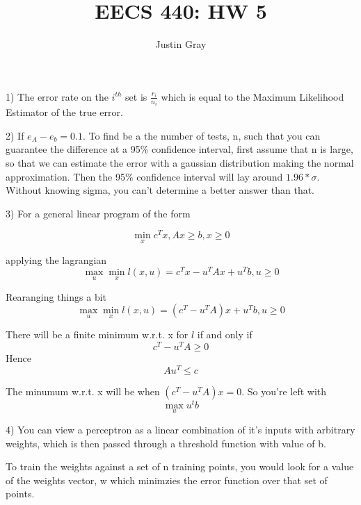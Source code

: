 \documentclass[12pt]{article}
\title{EECS 440: HW 5}
\author{Justin Gray}
\begin{document}
\maketitle
\setcounter{equation}{0}

1) The error rate on the $i^{th}$ set is $\frac{r_i}{n_i}$ which is equal to the 
Maximum Likelihood Estimator of the true error. 

2) If $e_A - e_b = 0.1$. To find be a the 
number of tests, n, such that you can guarantee the difference at a 95\% 
confidence interval, first assume that n is large, so that we can estimate the 
error with a gaussian distribution making the normal approximation. Then 
the 95\% confidence interval will lay around $1.96*\sigma$. Without knowing 
sigma, you can't determine a better answer than that. 

\setcounter{equation}{0}

3) 
For a general linear program of the form

\begin{equation}
    \min_x c^T x, Ax \geq b, x \geq 0
\end{equation}

applying the lagrangian
\begin{equation}
   \max_u \min_x l(x,u) = c^T x - u^T A x + u^T b, u \geq 0
\end{equation} 

Rearanging things a bit
\begin{equation}
     \max_u \min_x l(x,u) = \left(c^T - u^T A \right) x + u^T b, u \geq 0
\end{equation}

There will be a finite minimum w.r.t. x for $l$ if and only if 
\begin{equation}
    c^T - u^T A  \geq 0 
\end{equation}
Hence
\begin{equation}
    A u^T \leq c 
\end{equation}

The minumum w.r.t. x will be when $\left(c^T - u^T A \right) x = 0 $. So you're 
left with 
\begin{equation}
    \max_u u^t b
\end{equation}


\pagebreak
\setcounter{equation}{0}
4) You can view a perceptron as a linear combination of it's inputs with 
arbitrary weights, which is then passed through a threshold function with value 
of b. 

To train the weights against a set of n training points, you would look for a
value of the weights vector, w which minimzies the error function over that set 
of points. 
\end{document}
